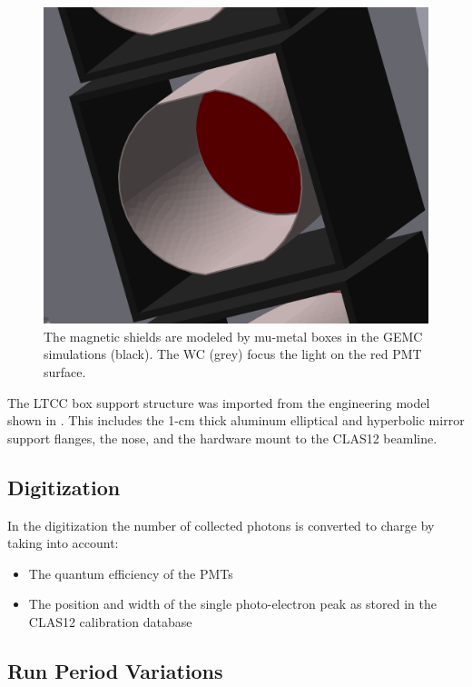 \begin{figure}
	\centering
	\includegraphics[width=0.99\columnwidth,keepaspectratio]{img/simShield.png}
	\caption{The magnetic shields are modeled by mu-metal boxes in the GEMC simulations (black). The WC (grey) focus the light on the red PMT surface.}
	\label{fig:simShield}
\end{figure}


The LTCC box support structure was imported from the engineering model shown in . This includes the 1-cm thick aluminum
elliptical and hyperbolic mirror support flanges, the nose, and the hardware mount to the CLAS12 beamline.


\subsection{Digitization}

In the digitization the number of collected photons is converted to charge by taking into account:

\begin{itemize}
	\item The quantum efficiency of the PMTs
	\item The position and width of the single photo-electron peak as stored in the CLAS12 calibration database
\end{itemize}


\subsection{Run Period Variations}

